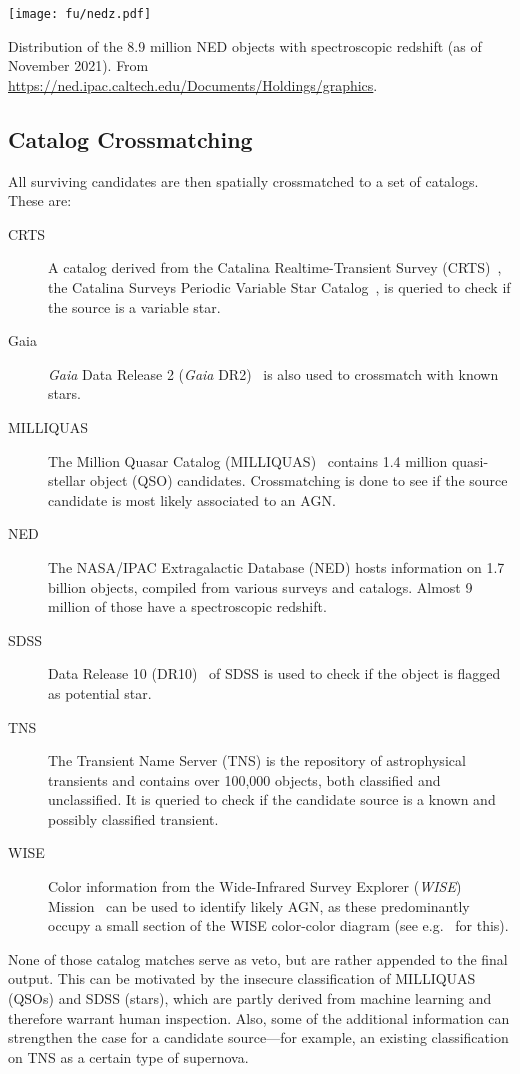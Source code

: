 \begin{marginfigure}
    \texttt{[image: fu/nedz.pdf]}
    \caption[NED spectroscopic redshift distribution]{Distribution of the 8.9 million NED objects with spectroscopic redshift (as of November 2021). From \url{https://ned.ipac.caltech.edu/Documents/Holdings/graphics}.}
\end{marginfigure}
\subsection{Catalog Crossmatching}\label{catmatch}
All surviving candidates are then spatially crossmatched to a set of catalogs. These are:
\begin{description}
    \item[CRTS] A catalog derived from the Catalina Realtime-Transient Survey (CRTS)~, the Catalina Surveys Periodic Variable Star Catalog~, is queried to check if the source is a variable star.
    \item[Gaia] \textit{Gaia} Data Release 2 (\textit{Gaia} DR2)~ is also used to crossmatch with known stars.
    \item[MILLIQUAS] The Million Quasar Catalog (MILLIQUAS)~ contains 1.4 million quasi-stellar object (QSO) candidates. Crossmatching is done to see if the source candidate is most likely associated to an AGN.
    \item[NED] The NASA/IPAC Extragalactic Database (NED) hosts information on 1.7 billion objects, compiled from various surveys and catalogs. Almost 9 million of those have a spectroscopic redshift.
    \item[SDSS] Data Release 10 (DR10)~ of SDSS is used to check if the object is flagged as potential star.
    \item[TNS] The Transient Name Server (TNS) is the repository of astrophysical transients and contains over 100,000 objects, both classified and unclassified. It is queried to check if the candidate source is a known and possibly classified transient.
    \item[WISE] Color information from the Wide-Infrared Survey Explorer (\textit{WISE}) Mission~ can be used to identify likely AGN, as these predominantly occupy a small section of the WISE color-color diagram (see e.g.~ for this).
\end{description}
None of those catalog matches serve as veto, but are rather appended to the final output. This can be motivated by the insecure classification of MILLIQUAS (QSOs) and SDSS (stars), which are partly derived from machine learning and therefore warrant human inspection. Also, some of the additional information can strengthen the case for a candidate source---for example, an existing classification on TNS as a certain type of supernova.

